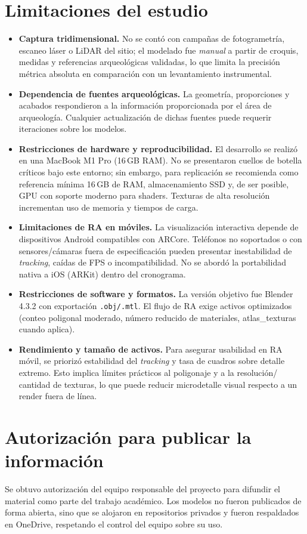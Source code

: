 \section{Limitaciones del estudio}
\begin{itemize}
  \item \textbf{Captura tridimensional.} No se contó con campañas de fotogrametría, escaneo láser o LiDAR del sitio; el modelado fue \emph{manual} a partir de croquis, medidas y referencias arqueológicas validadas, lo que limita la precisión métrica absoluta en comparación con un levantamiento instrumental.
  \item \textbf{Dependencia de fuentes arqueológicas.} La geometría, proporciones y acabados respondieron a la información proporcionada por el área de arqueología. Cualquier actualización de dichas fuentes puede requerir iteraciones sobre los modelos.
  \item \textbf{Restricciones de hardware y reproducibilidad.} El desarrollo se realizó en una MacBook M1 Pro (16\,GB RAM). No se presentaron cuellos de botella críticos bajo este entorno; sin embargo, para replicación se recomienda como referencia mínima 16\,GB de RAM, almacenamiento SSD y, de ser posible, GPU con soporte moderno para shaders. Texturas de alta resolución incrementan uso de memoria y tiempos de carga.
  \item \textbf{Limitaciones de RA en móviles.} La visualización interactiva depende de dispositivos Android compatibles con \gls{ARCore}. Teléfonos no soportados o con sensores/cámaras fuera de especificación pueden presentar inestabilidad de \emph{tracking}, caídas de FPS o incompatibilidad. No se abordó la portabilidad nativa a iOS (\gls{ARKit}) dentro del cronograma.
  \item \textbf{Restricciones de software y formatos.} La versión objetivo fue Blender 4.3.2 con exportación \texttt{.obj/.mtl}. El flujo de RA exige activos optimizados (conteo poligonal moderado, número reducido de materiales, \gls{atlas_texturas} cuando aplica). 
  \item \textbf{Rendimiento y tamaño de activos.} Para asegurar usabilidad en RA móvil, se priorizó estabilidad del \emph{tracking} y tasa de cuadros sobre detalle extremo. Esto implica límites prácticos al \gls{poligonaje} y a la resolución/ cantidad de texturas, lo que puede reducir microdetalle visual respecto a un render fuera de línea.
\end{itemize}

\section{Autorización para publicar la información}
Se obtuvo autorización del equipo responsable del proyecto para difundir el material como parte del trabajo académico. Los modelos no fueron publicados de forma abierta, sino que se alojaron en repositorios privados y fueron respaldados en OneDrive, respetando el control del equipo sobre su uso.

